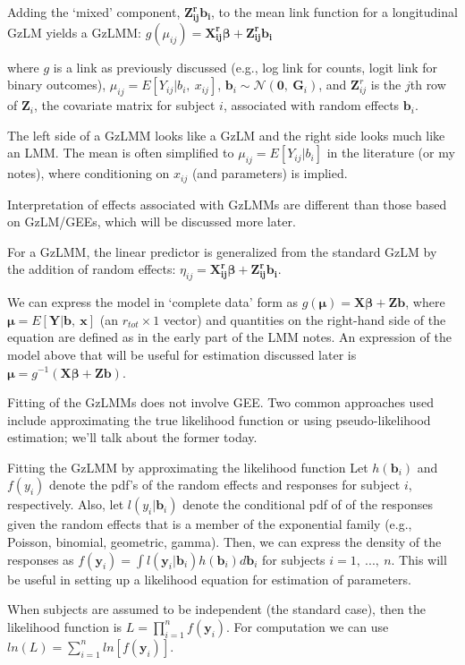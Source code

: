 \documentclass[
  9pt,
  ignorenonframetext,
]{beamer}
\begin{document}
\begin{frame}{}
\protect\hypertarget{section}{}
Adding the `mixed' component, \(\pmb {Z_{ij}^r b_i}\), to the mean link
function for a longitudinal GzLM yields a GzLMM:
\(g(\mu_{ij} ) =\pmb {X_{ij}^r \beta}+\pmb {Z_{ij}^r b_i}\)

where \(g\) is a link as previously discussed (e.g., log link for
counts, logit link for binary outcomes),
\(\mu_{ij}=E[Y_{ij} |b_i,\ x_{ij}]\),
\(\pmb b_i \sim \mathcal N (\pmb 0,\ \pmb G_i)\), and \(\pmb Z_{ij}^r\)
is the \(j\)th row of \(\pmb Z_i\), the covariate matrix for subject
\(i\), associated with random effects \(\pmb b_i\).

The left side of a GzLMM looks like a GzLM and the right side looks much
like an LMM. The mean is often simplified to \(\mu_{ij}=E[Y_{ij} |b_i]\)
in the literature (or my notes), where conditioning on \(x_{ij}\) (and
parameters) is implied.

Interpretation of effects associated with GzLMMs are different than
those based on GzLM/GEEs, which will be discussed more later.

For a GzLMM, the linear predictor is generalized from the standard GzLM
by the addition of random effects:
\(\eta _{ij}=\pmb {X_{ij}^r \beta}+\pmb {Z_{ij}^r b_i}\).
\end{frame}

\begin{frame}{}
\protect\hypertarget{section-1}{}
We can express the model in `complete data' form as
\(g(\pmb \mu)= \pmb {X\beta} + \pmb {Zb}\), where
\(\pmb \mu =E[\pmb Y|\pmb b,\ \pmb x]\) (an \(r_{tot} \times 1\) vector)
and quantities on the right-hand side of the equation are defined as in
the early part of the LMM notes. An expression of the model above that
will be useful for estimation discussed later is
\(\pmb \mu = g^{-1} (\pmb {X\beta} + \pmb {Zb})\).

Fitting of the GzLMMs does not involve GEE. Two common approaches used
include approximating the true likelihood function or using
pseudo-likelihood estimation; we'll talk about the former today.
\end{frame}

\begin{frame}{Fitting the GzLMM by approximating the likelihood
function}
\protect\hypertarget{fitting-the-gzlmm-by-approximating-the-likelihood-function}{}
Let \(h(\pmb b_i)\) and \(f(y_i)\) denote the pdf's of the random
effects and responses for subject \(i\), respectively. Also, let
\(l(y_i | \pmb b_i)\) denote the conditional pdf of of the responses
given the random effects that is a member of the exponential family
(e.g., Poisson, binomial, geometric, gamma). Then, we can express the
density of the responses as
\(f(\pmb y_i) = \int l(\pmb y_i |\pmb b_i)h(\pmb b_i)d\pmb b_i\) for
subjects \(i=1,\ ...,\ n\). This will be useful in setting up a
likelihood equation for estimation of parameters.

When subjects are assumed to be independent (the standard case), then
the likelihood function is \(L=\prod _{i=1}^nf(\pmb y_i)\). For
computation we can use \(ln(L)=\sum _{i=1}^nln[f(\pmb y_i)]\).
\end{frame}
\end{document}

